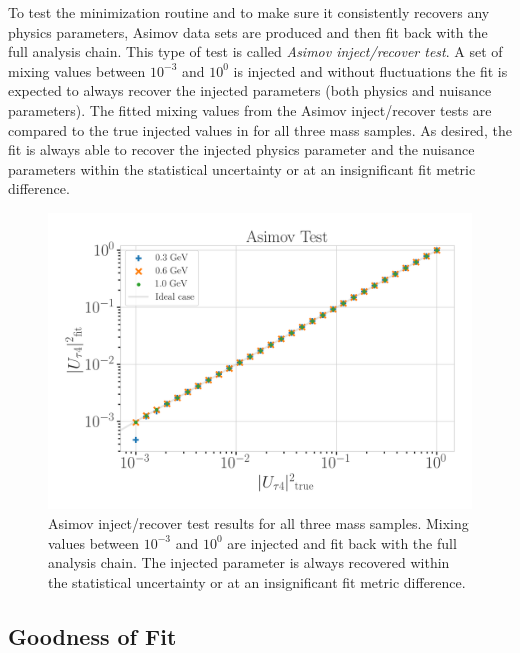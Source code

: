 To test the minimization routine and to make sure it consistently recovers any physics parameters, Asimov data sets are produced  and then fit back with the full analysis chain. This type of test is called \textit{Asimov inject/recover test}. A set of mixing values between $10^{-3}$ and $10^{0}$ is injected and without fluctuations the fit is expected to always recover the injected parameters (both physics and nuisance parameters). The fitted mixing values from the Asimov inject/recover tests are compared to the true injected values in  for all three mass samples. As desired, the fit is always able to recover the injected physics parameter and the nuisance parameters within the statistical uncertainty or at an insignificant fit metric difference. 

\begin{figure}[h]
    \includegraphics{figures/results/checks/asimov_tests_combined.png}
	\caption[Asimov inject/recover test]{Asimov inject/recover test results for all three mass samples. Mixing values between $10^{-3}$ and $10^{0}$ are injected and fit back with the full analysis chain. The injected parameter is always recovered within the statistical uncertainty or at an insignificant fit metric difference.}
\end{figure}


\subsection{Goodness of Fit} 

